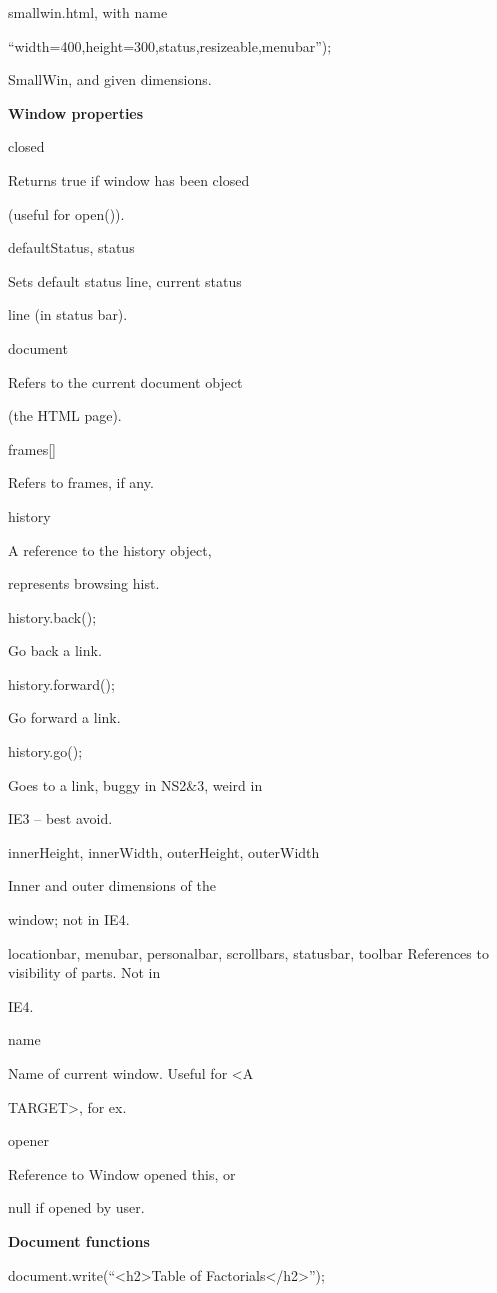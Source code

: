 \documentclass[
]{article}
\begin{document}
smallwin.html, with name

``width=400,height=300,status,resizeable,menubar'');

SmallWin, and given dimensions.

\textbf{Window properties}

closed

Returns true if window has been closed

(useful for open()).

defaultStatus, status

Sets default status line, current status

line (in status bar).

document

Refers to the current document object

(the HTML page).

frames{[}{]}

Refers to frames, if any.

history

A reference to the history object,

represents browsing hist.

history.back();

Go back a link.

history.forward();

Go forward a link.

history.go();

Goes to a link, buggy in NS2\&3, weird in

IE3 -- best avoid.

innerHeight, innerWidth, outerHeight, outerWidth

Inner and outer dimensions of the

window; not in IE4.

locationbar, menubar, personalbar, scrollbars, statusbar, toolbar
References to visibility of parts. Not in

IE4.

name

Name of current window. Useful for \textless A

TARGET\textgreater, for ex.

opener

Reference to Window opened this, or

null if opened by user.

\textbf{Document functions}

document.write(``\textless h2\textgreater Table of
Factorials\textless/h2\textgreater'');
\end{document}
